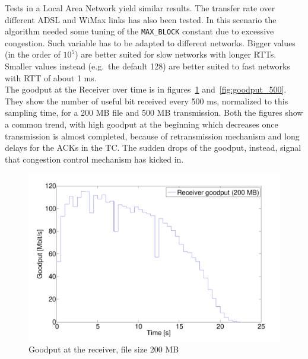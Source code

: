 \documentclass[10pt,twocolumn]{article}
\begin{document}
Tests in a Local Area Network yield similar results. The transfer rate over different ADSL and WiMax links has also been tested. In
this scenario the algorithm needed some tuning of the \texttt{MAX\_BLOCK}
constant due to excessive congestion. Such variable has to be adapted to
different networks. Bigger values (in the order of $10^5$) are better suited
for slow networks with longer RTTs. Smaller values instead (e.g.\ the default
128) are better suited to fast networks with RTT of about 1 ms. \\
The goodput at the Receiver over time is in figures~\ref{fig:goodput_200} and~\ref{fig:goodput_500}. They show the number of useful bit received every 500 ms, normalized to this sampling time, for a 200 MB file and 500 MB transmission. Both the figures show a common trend, with high goodput at the beginning which decreases once transmission is almost completed, because of retransmission mechanism and long delays for the ACKs in the TC. The sudden drops of the goodput, instead, signal that congestion control mechanism has kicked in.\\

\begin{figure}[htp]
  \centering
  \includegraphics[width = 0.95\columnwidth, keepaspectratio]{tex/images/goodput_c2_200.pdf}
  \caption{Goodput at the receiver, file size 200 MB}
  \label{fig:goodput_200}
\end{figure}
\end{document}
